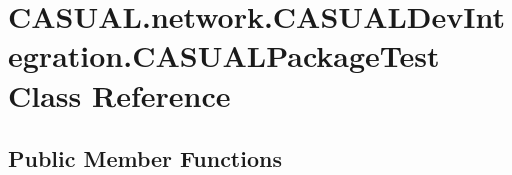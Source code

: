 \hypertarget{class_c_a_s_u_a_l_1_1network_1_1_c_a_s_u_a_l_dev_integration_1_1_c_a_s_u_a_l_package_test}{\section{C\-A\-S\-U\-A\-L.\-network.\-C\-A\-S\-U\-A\-L\-Dev\-Integration.\-C\-A\-S\-U\-A\-L\-Package\-Test Class Reference}
\label{class_c_a_s_u_a_l_1_1network_1_1_c_a_s_u_a_l_dev_integration_1_1_c_a_s_u_a_l_package_test}
}
\subsection*{Public Member Functions}
